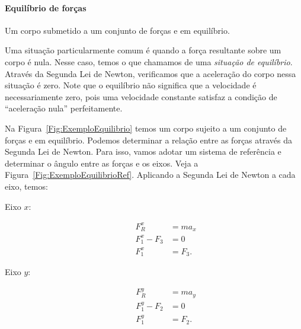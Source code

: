 \paragraph{Equilíbrio de forças}

\begin{marginfigure}[3cm]
\centering
{}
\caption{Um corpo submetido a um conjunto de forças e em equilíbrio.\label{Fig:ExemploEquilibrio}}
\end{marginfigure}

Uma situação particularmente comum é quando a força resultante sobre um corpo é nula. Nesse caso, temos o que chamamos de uma \emph{situação de equilíbrio}. Através da Segunda Lei de Newton, verificamos que a aceleração do corpo nessa situação é zero. Note que o equilíbrio não significa que a velocidade é necessariamente zero, pois uma velocidade constante satisfaz a condição de ``aceleração nula'' perfeitamente.

Na Figura~\ref{Fig:ExemploEquilibrio} temos um corpo sujeito a um conjunto de forças e em equilíbrio. Podemos determinar a relação entre as forças através da Segunda Lei de Newton. Para isso, vamos adotar um sistema de referência e determinar o ângulo entre as forças e os eixos. Veja a Figura~\ref{Fig:ExemploEquilibrioRef}. Aplicando a Segunda Lei de Newton a cada eixo, temos:
\begin{description}
    \item[Eixo $x$:]
        \begin{align}
            F_R^x &= m a_x \\
            F_1^x - F_3 &= 0 \\
            F_1^x &= F_3.
        \end{align}
    \item[Eixo $y$:]
        \begin{align}
            F_R^y &= m a_y \\
            F_1^y - F_2 &= 0 \\
            F_1^y &= F_2.
        \end{align}
\end{description}

